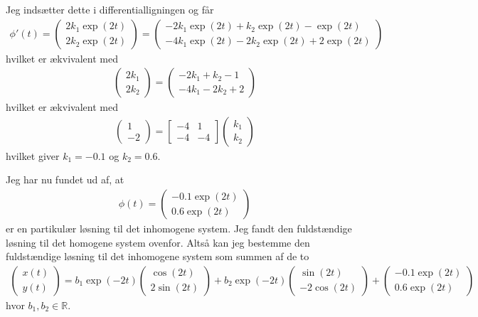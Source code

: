 \documentclass[12pt]{article}
\begin{document}
Jeg indsætter dette i differentialligningen og får
\begin{align}
\phi'(t) = \begin{pmatrix}
2k_1 \exp(2t) \\ 2k_2 \exp(2t)
\end{pmatrix} = \begin{pmatrix}
-2k_1\exp(2t) + k_2\exp(2t) - \exp(2t) \\
-4k_1\exp(2t) - 2k_2\exp(2t) + 2\exp(2t)
\end{pmatrix}
\end{align}
hvilket er ækvivalent med
\begin{align}
\begin{pmatrix}
2k_1  \\ 2k_2 
\end{pmatrix} = \begin{pmatrix}
-2k_1 + k_2 - 1 \\
-4k_1 - 2k_2 + 2
\end{pmatrix}
\end{align}
hvilket er ækvivalent med
\begin{align}
\begin{pmatrix}
1  \\ -2 
\end{pmatrix} = \begin{bmatrix}
-4 & 1  \\
-4 & - 4
\end{bmatrix} \begin{pmatrix}
k_1 \\ k_2
\end{pmatrix}
\end{align}
hvilket giver $k_1=-0.1$ og $k_2=0.6$.

Jeg har nu fundet ud af, at 
\begin{align}
\phi(t) = \begin{pmatrix}
-0.1 \exp(2t) \\ 0.6 \exp(2t)
\end{pmatrix}
\end{align}
er en partikulær løsning til det inhomogene system. Jeg fandt den fuldstændige løsning til det homogene system ovenfor. Altså kan jeg bestemme den fuldstændige løsning til det inhomogene system som summen af de to
\begin{align}
\begin{pmatrix}
x(t) \\ y(t)
\end{pmatrix} = b_1\exp(-2t) \begin{pmatrix}
\cos(2t) \\ 2\sin(2t)
\end{pmatrix} + b_2\exp(-2t) \begin{pmatrix}
\sin(2t) \\ -2\cos(2t)
\end{pmatrix} + \begin{pmatrix}
-0.1 \exp(2t) \\ 0.6 \exp(2t)
\end{pmatrix}
\end{align}
hvor $b_1, b_2 \in \mathbb{R}$.
\end{document}
